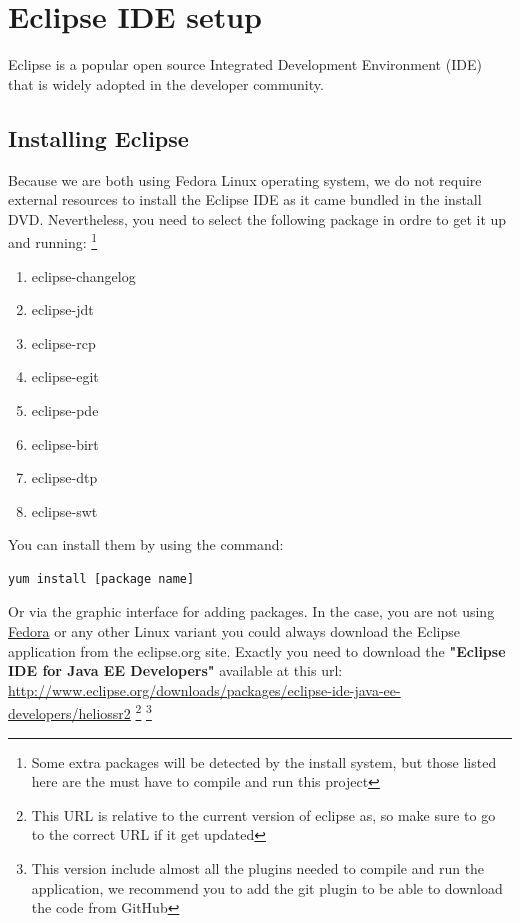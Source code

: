 
\section{Eclipse IDE setup}
Eclipse is a popular open source Integrated Development Environment (IDE) that is widely
adopted in the developer community.

\subsection{Installing Eclipse}
Because we are both using Fedora Linux operating system, we do not require external resources to install the Eclipse IDE as it came bundled in the install DVD. Nevertheless, you need to select the following package in ordre to get it up and running:
\footnote{Some extra packages will be detected by the install system, but those listed here are the must have to compile and run this project}

\begin{enumerate}
\item eclipse-changelog
\item eclipse-jdt
\item eclipse-rcp
\item eclipse-egit
\item eclipse-pde
\item eclipse-birt
\item eclipse-dtp
\item eclipse-swt
\end{enumerate}

You can install them by using the command:
\begin{verbatim}
yum install [package name]
\end{verbatim}
Or via the graphic interface for adding packages. In the case, you are not using \href{http://fedoraproject.org}{Fedora} or any other Linux variant you could
always download the Eclipse application from the eclipse.org site. Exactly you need to download the \textbf{"Eclipse IDE for Java EE Developers"} available at this url:\\ {\url{http://www.eclipse.org/downloads/packages/eclipse-ide-java-ee-developers/heliossr2}}
\footnote{This URL is relative to the current version of eclipse as, so make sure to go to the correct URL if it get updated}
\footnote{This version include almost all the plugins needed to compile and run the application, we recommend you to add the git plugin to be able to download the code from GitHub}

